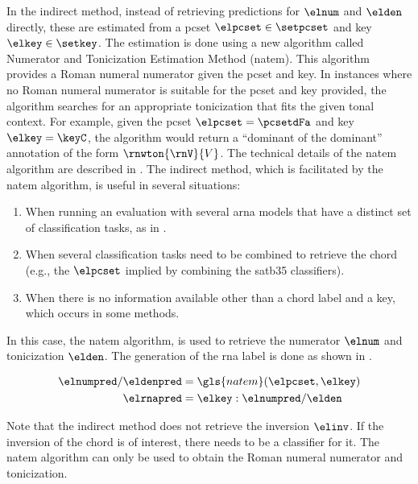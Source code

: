 

In the indirect method, instead of retrieving predictions
for $\elnum$ and $\elden$ directly, these are estimated from
a \gls{pcset} $\elpcset \in \setpcset$ and key $\elkey \in
\setkey$. The estimation is done using a new algorithm
called Numerator and Tonicization Estimation Method
(\gls{natem}). This algorithm provides a Roman numeral
numerator given the \gls{pcset} and key. In instances where
no Roman numeral numerator is suitable for the \gls{pcset}
and key provided, the algorithm searches for an appropriate
tonicization that fits the given tonal context. For example,
given the \gls{pcset} $\elpcset = \pcsetdFa$ and key $\elkey
= \keyC$, the algorithm would return a ``dominant of the
dominant'' annotation of the form $\rnwton{\rnV}{V}$. The
technical details of the \gls{natem} algorithm are described
in . The
indirect method, which is facilitated by the \gls{natem}
algorithm, is useful in several situations: 

\begin{enumerate}
    \item When running an evaluation with several \gls{arna}
    models that have a distinct set of classification tasks,
    as in .
    \item When several classification tasks need to be
    combined to retrieve the chord (e.g., the $\elpcset$
    implied by combining the \gls{satb35} classifiers).
    \item When there is no information available other than
    a chord label and a key, which occurs in some methods.
\end{enumerate}

In this case, the \gls{natem} algorithm, is used to retrieve
the numerator $\elnum$ and tonicization $\elden$. The
generation of the \gls{rna} label is done as shown in
.

\begin{equation}
    \label{eq:rna_indirect}
    \begin{split}
        \elnumpred / \eldenpred &= \gls{natem}(\elpcset, \elkey) \\
        \elrnapred &= \elkey : \elnumpred / \elden 
    \end{split}
\end{equation}

Note that the indirect method does not retrieve the
inversion $\elinv$. If the inversion of the chord is of
interest, there needs to be a classifier for it. The
\gls{natem} algorithm can only be used to obtain the Roman
numeral numerator and tonicization. 


